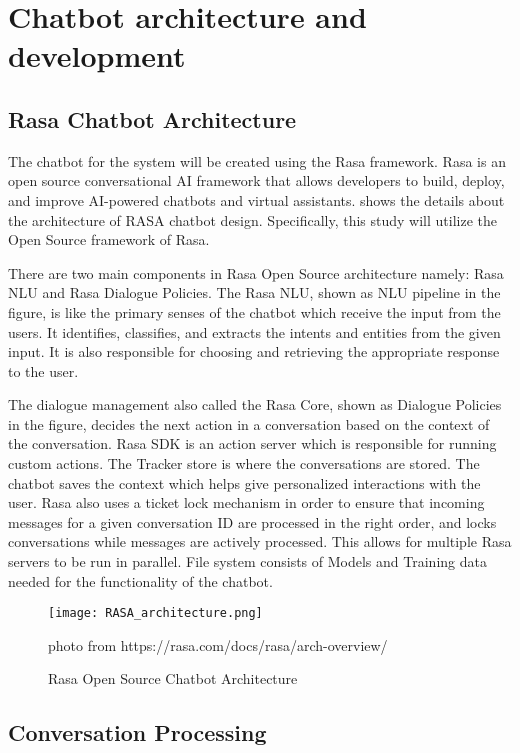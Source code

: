 \section{Chatbot architecture and development}

\subsection{Rasa Chatbot Architecture}

The chatbot for the system will be created using the Rasa framework. Rasa is an open source conversational AI framework that allows developers to build, deploy, and improve AI-powered chatbots and virtual assistants.  shows the details about the architecture of RASA chatbot design. Specifically, this study will utilize the Open Source framework of Rasa.

There are two main components in Rasa Open Source architecture namely: Rasa NLU and Rasa Dialogue Policies. The Rasa NLU, shown as NLU pipeline in the figure, is like the primary senses of the chatbot which receive the input from the users. It identifies, classifies, and extracts the intents and entities from the given input. It is also responsible for choosing and retrieving the appropriate response to the user. 

The dialogue management also called the Rasa Core, shown as Dialogue Policies in the figure, decides the next action in a conversation based on the context of the conversation. Rasa SDK is an action server which is responsible for running custom actions. The Tracker store is where the conversations are stored. The chatbot saves the context which helps give personalized interactions with the user. Rasa also uses a ticket lock mechanism in order to ensure that incoming messages for a given conversation ID are processed in the right order, and locks conversations while messages are actively processed. This allows for multiple Rasa servers to be run in parallel. File system consists of Models and Training data needed for the functionality of the chatbot.

\begin{figure}[h]
	\centering 
	\texttt{[image: RASA\_architecture.png]}
	\caption{Rasa Open Source Chatbot Architecture}
	photo from https://rasa.com/docs/rasa/arch-overview/
	\label{fig:rasa_architecture}
\end{figure}

\subsection {Conversation Processing}

